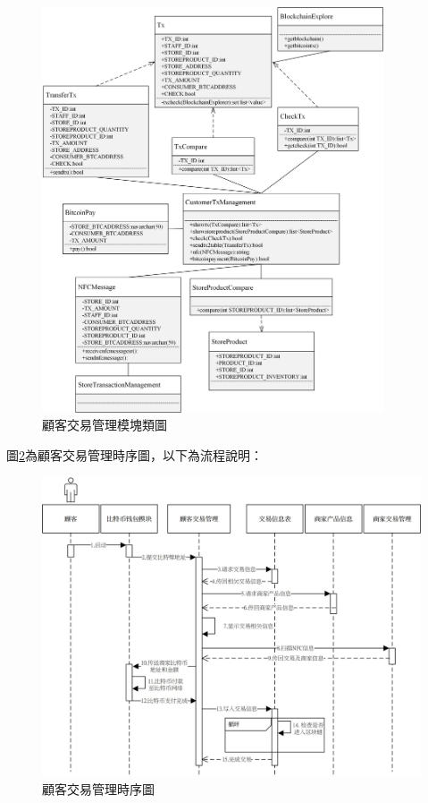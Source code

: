 	\begin{figure}[!htbp]
		\centering
		\includegraphics[width = 0.9\textwidth]{c4.jpg}
		\caption{顧客交易管理模塊類圖}\label{c4}
	\end{figure}

	

	圖\ref{time5}為顧客交易管理時序圖，以下為流程說明：

	\begin{figure}[!htbp]
		\centering
		\includegraphics[width = 1\textwidth]{time5.jpg}
		\caption{顧客交易管理時序圖}\label{time5}
	\end{figure}

